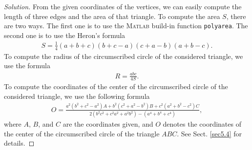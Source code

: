 \documentclass[11pt,a4paper,center,notitlepage]{article}
\numberwithin{equation}{section}
\begin{document}
\begin{proof}[Solution]
From the given coordinates of the vertices, we can easily compute the length of three edges and the area of that triangle. To compute the area $S$, there are two ways. The first one is to use the \textsc{Matlab} build-in function \verb|polyarea|. The second one is to use the Heron's formula
\begin{align}
S = \frac{1}{4}\left( {a + b + c} \right)\left( {b + c - a} \right)\left( {c + a - b} \right)\left( {a + b - c} \right).
\end{align}
To compute the radius of the circumscribed circle of the considered triangle, we use the formula
\begin{align}
R = \frac{{abc}}{{4S}}.
\end{align}
To compute the coordinates of the center of the circumscribed circle of the considered triangle, we use the following formula
\begin{align}
O = \frac{{{a^2}\left( {{b^2} + {c^2} - {a^2}} \right)A + {b^2}\left( {{c^2} + {a^2} - {b^2}} \right)B + {c^2}\left( {{a^2} + {b^2} - {c^2}} \right)C}}{{2\left( {{b^2}{c^2} + {c^2}{a^2} + {a^2}{b^2}} \right) - \left( {{a^4} + {b^4} + {c^4}} \right)}} , 
\end{align}
where $A$, $B$, and $C$ are the coordinates given, and $O$ denotes the coordinates of the center of the circumscribed circle of the triangle $ABC$. See Sect. \ref{sec5.4} for details.


\end{proof}
\end{document}
